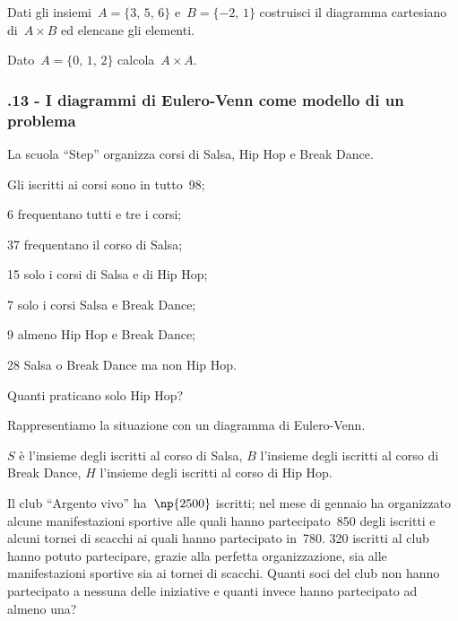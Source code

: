 \begin{esercizio}
 \label{ese:\thechapter.76}
Dati gli insiemi~$A=\{\text{3, 5, 6}\}$ e~$B=\{-2\text{, }1\}$ costruisci il
diagramma cartesiano di~$A\times B$ ed elencane gli elementi.
\end{esercizio}

\begin{esercizio}
 \label{ese:\thechapter.77}
 Dato~$A=\{\text{0, 1, 2}\}$ calcola~$A\times A$.
\end{esercizio}

\subsubsection*{\thechapter.13 - I diagrammi di Eulero-Venn come modello di un problema}

\begin{esercizio}[\Ast]
\label{ese:\thechapter.78}
La scuola ``Step'' organizza corsi di Salsa, Hip Hop e Break Dance.

\begin{enumeratea}
\item Gli iscritti ai corsi sono in tutto~98;
\item 6 frequentano tutti e tre i corsi;
\item 37 frequentano il corso di Salsa;
\item 15 solo i corsi di Salsa e di Hip Hop;
\item 7 solo i corsi Salsa e Break Dance;
\item 9 almeno Hip Hop e Break Dance;
\item 28 Salsa o Break Dance ma non Hip Hop.
\end{enumeratea}

Quanti praticano solo Hip Hop?

Rappresentiamo la situazione con un diagramma di Eulero-Venn.
\begin{center}
 
\end{center}
$S$ è l'insieme degli iscritti al corso di Salsa, $B$ l'insieme degli iscritti al corso di
Break Dance, $H$ l'insieme degli iscritti al corso di Hip Hop.
\end{esercizio}

\begin{esercizio}
\label{ese:\thechapter.79}
Il club ``Argento vivo'' ha~$\np{2500}$ iscritti; nel mese di gennaio ha organizzato alcune
manifestazioni sportive alle quali hanno partecipato~850 degli iscritti
e alcuni tornei di scacchi ai quali hanno partecipato in~780. 320
iscritti al club hanno potuto partecipare, grazie alla perfetta
organizzazione, sia alle manifestazioni sportive sia ai tornei di
scacchi. Quanti soci del club non hanno partecipato a nessuna delle
iniziative e quanti invece hanno partecipato ad almeno una?
\end{esercizio}

